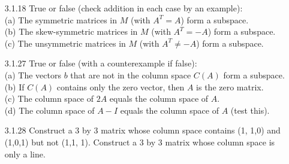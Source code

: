 \documentclass[10pt,twoside,reqno]{article}
\begin{document}
\begin{enumerate}
\item[3.1.18] True or false (check addition in each case by an example): \\ \vspace{1mm}
{\addtolength{\leftskip}{5mm}
(a) The symmetric matrices in $M$ (with $A^T = A$) form a subspace. \\ \vspace{1mm}
(b) The skew-symmetric matrices in $M$ (with $A^T = -A$) form a subspace. \\ \vspace{1mm}
(c) The unsymmetric matrices in $M$ (with $A^T \neq -A$) form a subspace.\\ \vspace{1mm}
}
\vspace{3mm}



\item[3.1.27] True or false (with a counterexample if false): \\ \vspace{1mm}
{\addtolength{\leftskip}{5mm}
(a) The vectors $b$ that are not in the column space $C (A)$ form a subspace. \\ \vspace{1mm}
(b) If $C (A)$ contains only the zero vector, then $A$ is the zero matrix.\\ \vspace{1mm} 
(c) The column space of $2A$ equals the column space of $A$. \\ \vspace{1mm}
(d) The column space of $A - I$ equals the column space of $A$ (test this).\\ \vspace{1mm}
}
\vspace{3mm}


\item[3.1.28] Construct a 3 by 3 matrix whose column space contains (1, 1,0) and (1,0,1) but not (1,1, 1). Construct a 3 by 3 matrix whose column space is only a line. \\
\vspace{3mm}


\end{enumerate}
\end{document}
